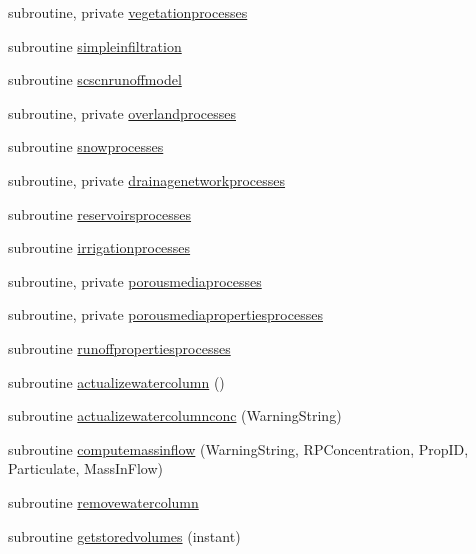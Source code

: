 \begin{DoxyCompactItemize}
\item 
subroutine, private \mbox{\hyperlink{namespacemodulebasin_a8345c242b1aed1c95c3779596054b89f}{vegetationprocesses}}
\item 
subroutine \mbox{\hyperlink{namespacemodulebasin_a7c47f016b2561d84dff67a1089c6c8f0}{simpleinfiltration}}
\item 
subroutine \mbox{\hyperlink{namespacemodulebasin_aa0b9eaedf50e780116499db9c0c35730}{scscnrunoffmodel}}
\item 
subroutine, private \mbox{\hyperlink{namespacemodulebasin_a4732062e95bfb4656920c8c89a412510}{overlandprocesses}}
\item 
subroutine \mbox{\hyperlink{namespacemodulebasin_a19824f46960f411ab472a65b6e3a9d2e}{snowprocesses}}
\item 
subroutine, private \mbox{\hyperlink{namespacemodulebasin_ab83592a7be03719e664d5eb440853228}{drainagenetworkprocesses}}
\item 
subroutine \mbox{\hyperlink{namespacemodulebasin_a2d6933b0b62fd8ddf365de6af6309c1c}{reservoirsprocesses}}
\item 
subroutine \mbox{\hyperlink{namespacemodulebasin_af1ae0091980128250cba6871d67a941c}{irrigationprocesses}}
\item 
subroutine, private \mbox{\hyperlink{namespacemodulebasin_aea9e156b76b5f88b91a7c975b33694ac}{porousmediaprocesses}}
\item 
subroutine, private \mbox{\hyperlink{namespacemodulebasin_abe3651d838039c895cf2f2192597ff85}{porousmediapropertiesprocesses}}
\item 
subroutine \mbox{\hyperlink{namespacemodulebasin_a0d5f24ad034e1da333cb8086aba4bf1f}{runoffpropertiesprocesses}}
\item 
subroutine \mbox{\hyperlink{namespacemodulebasin_a6b7803a58ac882de2847f5af4c47cf02}{actualizewatercolumn}} ()
\item 
subroutine \mbox{\hyperlink{namespacemodulebasin_a3ad94088588cc4ac448ba73dc73a3f61}{actualizewatercolumnconc}} (Warning\+String)
\item 
subroutine \mbox{\hyperlink{namespacemodulebasin_a106653309e017391895ef068b14bfdc2}{computemassinflow}} (Warning\+String, R\+P\+Concentration, Prop\+ID, Particulate, Mass\+In\+Flow)
\item 
subroutine \mbox{\hyperlink{namespacemodulebasin_a2c7426bfbfa1e3a2540f18b8e04ec4b5}{removewatercolumn}}
\item 
subroutine \mbox{\hyperlink{namespacemodulebasin_a51eb37f44f2fb4685ca3ed3454156732}{getstoredvolumes}} (instant)

\end{DoxyCompactItemize}
